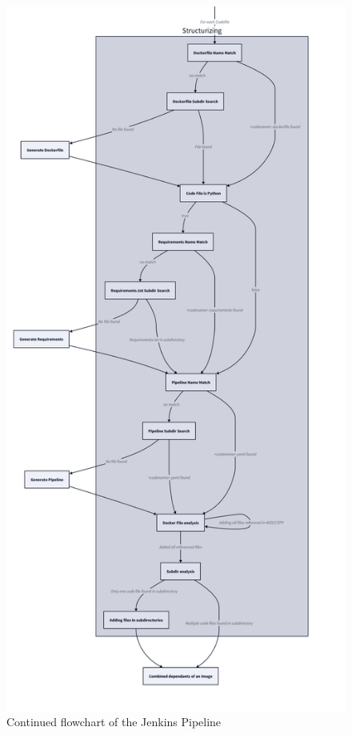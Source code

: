\begin{figure}[H]
  \centering
  \includegraphics[width=12cm]{graphics/flowchart_pipeline_lower.png}
  \caption{Continued flowchart of the Jenkins Pipeline}
  \label{abb:flowchart_pipeline_lower}
\end{figure}

\newpage



\label{appendix:minikube_installation_instructions}


\label{appendix:cicd_installation_instructions}

